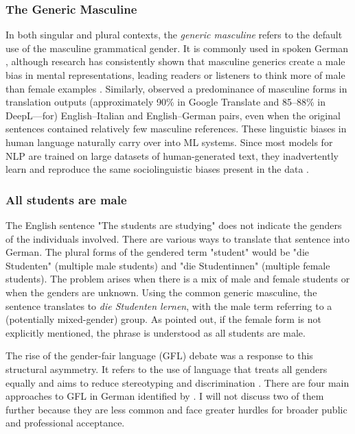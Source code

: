 \subsubsection{The Generic Masculine}  
In both singular and plural contexts, the \textit{generic masculine} refers to the default use of the masculine grammatical gender. It is commonly used in spoken German \citep{lardelliBuildingBridgesDataset2024,schmitzGermanAllProfessors2022}, although research has consistently shown that masculine generics create a male bias in mental representations, leading readers or listeners to think more of male than female examples \citep{sczesnyCanGenderFairLanguage2016}. Similarly, \citet{rescignoGenderBiasMachine2023} observed a predominance of masculine forms in translation outputs (approximately 90\% in Google Translate and 85–88\% in DeepL—for) English–Italian and English–German pairs, even when the original sentences contained relatively few masculine references. These linguistic biases in human language naturally carry over into ML systems. Since most models for NLP are trained on large datasets of human-generated text, they inadvertently learn and reproduce the same sociolinguistic biases present in the data \citep{choMeasuringGenderBias2019}.

\subsubsection{All students are male}
The English sentence "The students are studying" does not indicate the genders of the individuals involved. There are various ways to translate that sentence into German. The plural forms of the gendered term "student" would be "die Studenten" (multiple male students) and "die Studentinnen" (multiple female students). The problem arises when there is a mix of male and female students or when the genders are unknown. 
Using the common generic masculine, the sentence translates to \textit{die Studenten lernen}, with the male term referring to a (potentially mixed-gender) group. As \citet{schmitzGermanAllProfessors2022} pointed out, if the female form is not explicitly mentioned, the phrase is understood as all students are male.

The rise of the gender-fair language (GFL) debate was a response to this structural asymmetry. It refers to the use of language that treats all genders equally and aims to reduce stereotyping and discrimination \citep{sczesnyCanGenderFairLanguage2016}. 
There are four main approaches to GFL in German identified by \citet{lardelliBuildingBridgesDataset2024}. I will not discuss two of them further because they are less common and face greater hurdles for broader public and professional acceptance.

